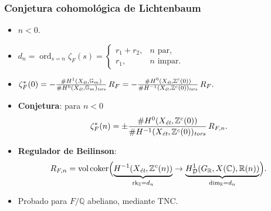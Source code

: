 \documentclass[handout]{beamer}
\newcommand{\CC}{\mathbb{C}}
\newcommand{\FF}{\mathbb{F}}
\newcommand{\PP}{\mathbb{P}}
\newcommand{\QQ}{\mathbb{Q}}
\newcommand{\RR}{\mathbb{R}}
\newcommand{\ZZ}{\mathbb{Z}}
\DeclareMathOperator{\coker}{coker}
\DeclareMathOperator{\ord}{ord}
\DeclareMathOperator{\rk}{rk}
\DeclareMathOperator{\vol}{vol}
\newcommand{\et}{\text{\it ét}}
\newcommand{\tors}{\text{\it tors}}
\begin{document}

\begin{frame}
  \frametitle{Conjetura cohomológica de Lichtenbaum}

  \begin{itemize}
  \item $n < 0$.

  \item $d_n = \ord_{s = n} \zeta_F (s) = \begin{cases}
      r_1 + r_2, & n\text{ par}, \\
      r_1, & n\text{ impar}.
    \end{cases}$

  \item $\zeta_F^* (0) = -\frac{\# H^1 (X_\et, \mathbb{G}_m)}{\# H^0 (X_\et, \mathbb{G}_m)_\tors}\,R_F = -\frac{\# H^0 (X_\et, \ZZ^c (0))}{\# H^{-1} (X_\et, \ZZ^c (0))_\tors}\,R_F.$

  \item \textbf{Conjetura}: para $n < 0$
    \[ \zeta_F^* (n) = \pm\frac{\# H^0 (X_\et, \ZZ^c (0))}{\# H^{-1} (X_\et, \ZZ^c (0))_\tors}\,R_{F,n}. \]

  \item \textbf{Regulador de Beilinson}:
    \[ R_{F,n} = \vol\coker \Bigl(\underbrace{H^{-1} (X_\et, \ZZ^c(n))}_{\rk_\ZZ = d_n} \to \underbrace{H^1_\mathcal{D} (G_\RR, X(\CC), \RR(n))}_{\dim_\RR = d_n}\Bigr). \]

  \item Probado para $F/\QQ$ abeliano, mediante TNC.
  \end{itemize}
\end{frame}


\iffalse
\begin{frame}
  \frametitle{Caso de curvas}

  \begin{itemize}
  \item $X = C/\FF_q$ cualquier curva.

  \item $\ord_{s = n} \zeta (X,s) = 0$ para $n < 0$.

  \item $\zeta (X,n) = \pm \frac{|H^0 (X_\et, \ZZ^c (n))|}{|H^{-1} (X_\et, \ZZ^c (n))| \cdot |H^1 (X_\et, \ZZ^c (n))|}$.

  \item Ejemplo singular: cúbica nodal $X = \PP^1_{\FF_q} / (0\sim 1)$.

    \begin{align*}
      H^{-1} (X_\et, \ZZ^c (n)) & = \ZZ/(q^{1-n} - 1), \\
      H^{0,1} (X_\et, \ZZ^c (n)) & = \ZZ/(q^{-n} - 1).
    \end{align*}

    \[ \zeta (X,s) = \frac{1}{1 - q^{-s}}. \]
  \end{itemize}
\end{frame}
\fi
\end{document}

